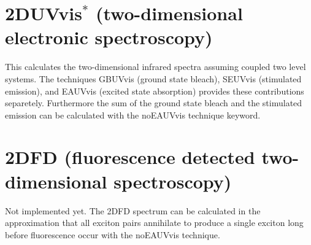 \section{2DUVvis$^{*}$ (two-dimensional electronic spectroscopy)}
This calculates the two-dimensional infrared spectra assuming coupled two level systems. The techniques GBUVvis (ground state bleach), SEUVvis (stimulated emission), and EAUVvis (excited state absorption) provides these contributions separetely. Furthermore the sum of the ground state bleach and the stimulated emission can be calculated with the noEAUVvis technique keyword. 
\section{2DFD (fluorescence detected two-dimensional spectroscopy)}
 Not implemented yet. The 2DFD spectrum can be calculated in the approximation that all exciton pairs annihilate to produce a single exciton long before fluorescence occur with the noEAUVvis technique.

